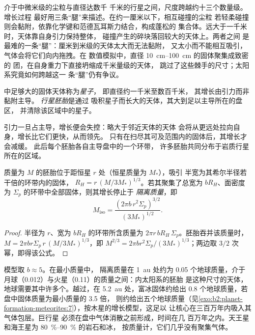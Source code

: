 介于中微米级的尘粒与直径达数千
千米的行星之间，尺度跨越约十三个数量级。增长过程
最好用三条“腿”来描述。在约一厘米以下，相互碰撞的尘粒
若轻柔碰撞则会黏附，依靠化学键和范德瓦耳斯力结合，构成蓬松的
集合体。远大于一千米时，天体靠自身引力保持整体，
碰撞产生的碎块落回较大的天体上。两者之间
是最难的一条“腿”：厘米到米级的天体太大而无法黏附，
又太小而不能相互吸引，气体会将它们向内拖拽。在
数值模拟中，直径 \qtyrange{10}{100}{cm} 的固体聚集成致密的
团，在自身重力下直接坍缩成千米量级的天体，
跳过了这些棘手的尺寸；太阳系究竟如何跨越这一
条“腿”仍有争议。

\begin{definition}[星子、行星胚胎]
\label{def:b2:planet-formation-meteorites:planetesimal}
中足够大的固体天体称为\emph{星子}，
即直径约一千米至数百千米，
其增长由引力而非黏附主导。
\emph{行星胚胎}是通过
吸积星子而长大的天体，其大到足以主导所在的盘区，
并清除该区域中的星子。
\end{definition}

引力一旦占主导，增长便会失控：略大于邻近天体的天体
会将从更远处拉向自身，增长比它们更快，从而领先。
只有在扫尽其可及范围内的固体后，其增长才会减缓。
此后每个胚胎各自主导盘中的一个环带，
许多胚胎共同分布于岩质行星所在的区域。

\begin{proposition}[隔离质量]\label{prop:b2:planet-formation-meteorites:isolation}
质量为 $M$ 的胚胎位于距恒星 $r$ 处（恒星质量为 $M_*$），吸引
半宽为其希尔半径若干倍的环带内的固体，
$R_H = r\,(M/3M_*)^{1/3}$。若其聚集了总宽为
$bR_H$、面密度为 $\Sigma_p$ 的环带中全部固体，则其增长停止于
\emph{隔离质量}，即
\[
  M_{\mathrm{iso}} = \frac{(2\pi b\, r^2 \Sigma_p)^{3/2}}{(3M_*)^{1/2}} .
\]
\end{proposition}

\begin{proof}
半径为 $r$、宽为 $bR_H$ 的环带所含质量为
$2\pi r\, bR_H\,\Sigma_p$。胚胎吞并该质量时，
$M = 2\pi b r\Sigma_p\, r\,(M/3M_*)^{1/3}$，即
$M^{2/3} = 2\pi b r^2\Sigma_p/(3M_*)^{1/3}$；两边取
$3/2$ 次幂，即得该公式。
\end{proof}

模型取 $b \approx 5$。在最小质量中，
隔离质量在 \qty{1}{au} 处约为 \num{0.05} 个地球质量，介于
月球（\num{0.012}）与火星（\num{0.11}）的质量之间：内太阳系的胚胎
是这种尺寸的天体，地球需要其中许多个。越过，在 \qty{5.2}{au} 处，富冰固体约给出
\num{0.8} 个地球质量，若盘中固体质量为最小质量的 \num{3.5} 倍，
则约给出五个地球质量（见\cref{exo:b2:planet-formation-meteorites:7}），按木星的增长模型，这足以
让核心在三百万年内吸入其气体包层。巨行星
必须在盘中气体消散之前形成，时间在几
百万年之内。天王星和海王星为 \qtyrange{80}{90}{\percent} 的岩石和冰，
按质量计，它们几乎没有聚集气体。

